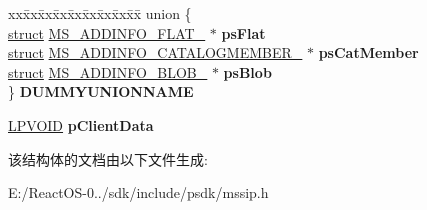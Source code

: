 \begin{DoxyCompactItemize}
\begin{tabbing}
xx\=xx\=xx\=xx\=xx\=xx\=xx\=xx\=xx\=\kill
union \{\\
\>\hyperlink{interfacestruct}{struct} \hyperlink{struct_m_s___a_d_d_i_n_f_o___f_l_a_t__}{MS\_ADDINFO\_FLAT\_} $\ast$ {\bfseries psFlat}\\
\>\hyperlink{interfacestruct}{struct} \hyperlink{struct_m_s___a_d_d_i_n_f_o___c_a_t_a_l_o_g_m_e_m_b_e_r__}{MS\_ADDINFO\_CATALOGMEMBER\_} $\ast$ {\bfseries psCatMember}\\
\>\hyperlink{interfacestruct}{struct} \hyperlink{struct_m_s___a_d_d_i_n_f_o___b_l_o_b__}{MS\_ADDINFO\_BLOB\_} $\ast$ {\bfseries psBlob}\\
\} {\bfseries DUMMYUNIONNAME}\\

\end{tabbing}\item 
\mbox{\label{struct_s_i_p___s_u_b_j_e_c_t_i_n_f_o___add90326f877d63d4c225ece6727c3729}} 
\hyperlink{interfacevoid}{L\+P\+V\+O\+ID} {\bfseries p\+Client\+Data}
\end{DoxyCompactItemize}


该结构体的文档由以下文件生成\+:\begin{DoxyCompactItemize}
\item 
E\+:/\+React\+O\+S-\/0../sdk/include/psdk/mssip.\+h\end{DoxyCompactItemize}
